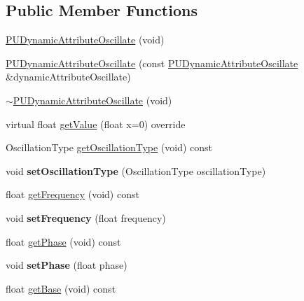 \subsection*{Public Member Functions}
\begin{DoxyCompactItemize}
\item 
\hyperlink{classPUDynamicAttributeOscillate_a61d288747e43dd28f86d99cb20595043}{P\+U\+Dynamic\+Attribute\+Oscillate} (void)
\item 
\hyperlink{classPUDynamicAttributeOscillate_a63667f8e4d78ac81951fb5d050e2ed30}{P\+U\+Dynamic\+Attribute\+Oscillate} (const \hyperlink{classPUDynamicAttributeOscillate}{P\+U\+Dynamic\+Attribute\+Oscillate} \&dynamic\+Attribute\+Oscillate)
\item 
\hyperlink{classPUDynamicAttributeOscillate_a127238844b9c36e66e7a410961dc7dd8}{$\sim$\+P\+U\+Dynamic\+Attribute\+Oscillate} (void)
\item 
virtual float \hyperlink{classPUDynamicAttributeOscillate_a01b85ebd9d38fa6d0276ae8b98337673}{get\+Value} (float x=0) override
\item 
Oscillation\+Type \hyperlink{classPUDynamicAttributeOscillate_a29bd2050848e147ea0492dedffcb69c9}{get\+Oscillation\+Type} (void) const
\item 
\mbox{\label{classPUDynamicAttributeOscillate_a551c0e6b24b46e162f005e01ff220445}} 
void {\bfseries set\+Oscillation\+Type} (Oscillation\+Type oscillation\+Type)
\item 
float \hyperlink{classPUDynamicAttributeOscillate_af8a1b226426bf7f180b62cb823af1594}{get\+Frequency} (void) const
\item 
\mbox{\label{classPUDynamicAttributeOscillate_a5c9f81187a931cc9c24c419842476e17}} 
void {\bfseries set\+Frequency} (float frequency)
\item 
float \hyperlink{classPUDynamicAttributeOscillate_a015486ebdae8dd9c71dd1bed413c5119}{get\+Phase} (void) const
\item 
\mbox{\label{classPUDynamicAttributeOscillate_a7f1d25dc486347b52ecbe370ca26204d}} 
void {\bfseries set\+Phase} (float phase)
\item 
float \hyperlink{classPUDynamicAttributeOscillate_adc434b9e002bf31436f522291de78b99}{get\+Base} (void) const
\item 
\mbox{\label{classPUDynamicAttributeOscillate_ac4e471bde537228a51ef8246f17afabf}} 

\end{DoxyCompactItemize}
